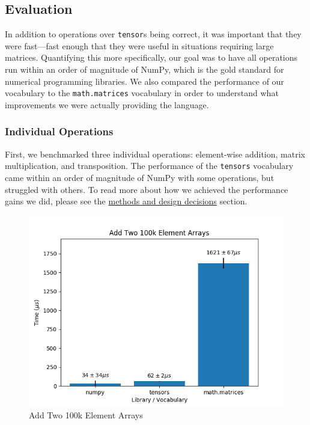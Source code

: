 \documentclass[
]{article}
\begin{document}
\hypertarget{evaluation}{%
\subsection{Evaluation}\label{evaluation}}

In addition to operations over \texttt{tensor}s being correct, it was
important that they were fast---fast enough that they were useful in
situations requiring large matrices. Quantifying this more specifically,
our goal was to have all operations run within an order of magnitude of
NumPy, which is the gold standard for numerical programming libraries.
We also compared the performance of our vocabulary to the
\texttt{math.matrices} vocabulary in order to understand what
improvements we were actually providing the language.

\hypertarget{individual-operations}{%
\subsubsection{Individual Operations}\label{individual-operations}}

First, we benchmarked three individual operations: element-wise
addition, matrix multiplication, and transposition. The performance of
the \texttt{tensors} vocabulary came within an order of magnitude of
NumPy with some operations, but struggled with others. To read more
about how we achieved the performance gains we did, please see the
\href{methods.md}{methods and design decisions} section.

\begin{figure}
\centering
\includegraphics{add.png}
\caption{Add Two 100k Element Arrays}
\end{figure}
\end{document}
